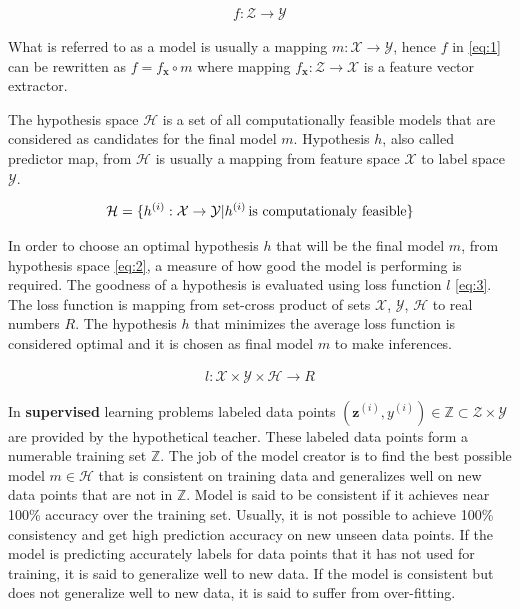 \documentclass[english, 12pt, a4paper, elec, utf8, online]{aaltothesis}
\begin{document}
\begin{align}\label{eq:1}
f: \mathcal{Z} \rightarrow \mathcal{Y}
\end{align}

What is referred to as a model is usually a mapping $m:\mathcal{X} \rightarrow \mathcal{Y}$, hence $f$ in \ref{eq:1} can be rewritten as $f = f_{\mathbf{x}} \circ m$ where mapping $f_{\mathbf{x}}:\mathcal{Z} \rightarrow \mathcal{X}$ is a feature vector extractor.
\pagebreak

The hypothesis space $\mathcal{H}$  is a set of all computationally feasible models that  are considered as candidates for the final model $m$. Hypothesis $h$, also called predictor map, from $\mathcal{H}$ is usually a mapping from feature space $\mathcal{X}$ to label space $\mathcal{Y}$.~\cite{Jung2018}

\begin{align}\label{eq:2}
\mathcal{H} = \{h^{(i)}:\mathcal{X} \rightarrow \mathcal{Y} | h^{(i)} \mkern3mu \text{is computationaly feasible} \}
\end{align}

In order to choose an optimal hypothesis $h$ that will be the final model $m$, from hypothesis space \ref{eq:2}, a measure of how good the model is performing is required. The goodness of a hypothesis is evaluated using loss function $l$ \ref{eq:3}. The loss function is mapping from set-cross product of sets $\mathcal{X}$, $\mathcal{Y}$, $\mathcal{H}$ to real numbers $R$. The hypothesis $h$ that minimizes the average loss function is considered optimal and it is chosen as final model $m$ to make inferences.  

\begin{align}\label{eq:3}
l:\mathcal{X} \times \mathcal{Y} \times \mathcal{H} \rightarrow R  
\end{align}

In \textbf{supervised} learning problems labeled data points $(\mathbf{z}^{(i)},y^{(i)}) \in \mathbb{Z} \subset \mathcal{Z} \times \mathcal{Y}$ are provided by the hypothetical teacher. These labeled data points form a numerable training set $\mathbb{Z}$. The job of the model creator is to find the best possible model $m \in \mathcal{H}$ that is consistent on training data and generalizes well on new data points that are not in $\mathbb{Z}$. Model is said to be consistent if it achieves near 100\% accuracy over the training set. Usually, it is not possible to achieve 100\% consistency and get high prediction accuracy on new unseen data points. If the model is predicting accurately labels for data points that it has not used for training, it is said to generalize well to new data. If the model is consistent but does not generalize well to new data, it is said to suffer from over-fitting.
\end{document}
